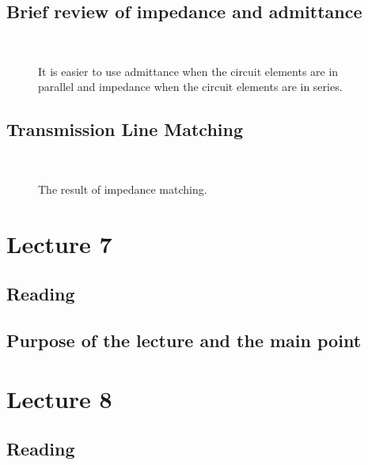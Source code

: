 \subsection{Brief review of impedance and admittance}


\begin{figure}[htbp]
\begin{center}
\strut{} \\
\end{center}
\caption{It is easier to use admittance when the circuit elements are in parallel and impedance when the circuit elements are in series.}
\label{wind}
\end{figure}




\subsection{Transmission Line Matching}



\begin{figure}[htbp]
\begin{center}
\strut{} \\
\end{center}
\caption{The result of impedance matching.}
\label{wind}
\end{figure}




\section{Lecture 7}


\subsection{Reading}


\subsection{Purpose of the lecture and the main point}


\section{Lecture 8}


\subsection{Reading}


